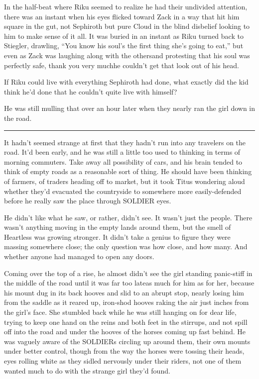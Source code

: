 In the half-beat where Riku seemed to realize he had their undivided attention, there was an instant when his eyes flicked toward Zack in a way that hit him square in the gut, not Sephiroth but pure Cloud in the blind disbelief looking to him to make sense of it all. It was buried in an instant as Riku turned back to Stiegler, drawling, ``You know his soul's the first thing she's going to eat,'' but even as Zack was laughing along with the others\textemdash and protesting that his soul was perfectly safe, thank you very much\textemdash he couldn't get that look out of his head.

If Riku could live with everything Sephiroth had done, what exactly did the kid think he'd done that he couldn't quite live with himself?

He was still mulling that over an hour later when they nearly ran the girl down in the road.

\fancybreak{\pfbreakdisplay}


It hadn't seemed strange at first that they hadn't run into any travelers on the road. It'd been early, and he was still a little too used to thinking in terms of morning commuters. Take away all possibility of cars, and his brain tended to think of empty roads as a reasonable sort of thing. He should have been thinking of farmers, of traders heading off to market, but it took Titus wondering aloud whether they'd evacuated the countryside to somewhere more easily-defended before he really saw the place through SOLDIER eyes.

He didn't like what he saw, or rather, didn't see. It wasn't just the people. There wasn't anything moving in the empty lands around them, but the smell of Heartless was growing stronger. It didn't take a genius to figure they were massing somewhere close; the only question was how close, and how many. And whether anyone had managed to open any doors.

Coming over the top of a rise, he almost didn't see the girl standing panic-stiff in the middle of the road until it was far too late\textemdash as much for him as for her, because his mount dug in its back hooves and slid to an abrupt stop, nearly losing him from the saddle as it reared up, iron-shod hooves raking the air just inches from the girl's face. She stumbled back while he was still hanging on for dear life, trying to keep one hand on the reins and both feet in the stirrups, and not spill off into the road and under the hooves of the horses coming up fast behind. He was vaguely aware of the SOLDIERs circling up around them, their own mounts under better control, though from the way the horses were tossing their heads, eyes rolling white as they sidled nervously under their riders, not one of them wanted much to do with the strange girl they'd found.

